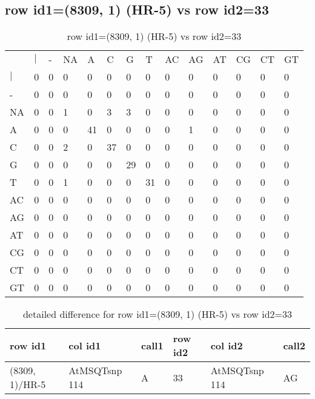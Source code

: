 \subsection{row id1=(8309, 1) (HR-5) vs row id2=33}
\begin{center}
\begin{longtable}{|l|l|l|l|l|l|l|l|l|l|l|l|l|l|}
\caption{row id1=(8309, 1) (HR-5) vs row id2=33} \label{table_dm292}\\
\hline
\\
\hline
&$|$&-&NA&A&C&G&T&AC&AG&AT&CG&CT&GT\\
$|$&0&0&0&0&0&0&0&0&0&0&0&0&0\\
-&0&0&0&0&0&0&0&0&0&0&0&0&0\\
NA&0&0&1&0&3&3&0&0&0&0&0&0&0\\
A&0&0&0&41&0&0&0&0&1&0&0&0&0\\
C&0&0&2&0&37&0&0&0&0&0&0&0&0\\
G&0&0&0&0&0&29&0&0&0&0&0&0&0\\
T&0&0&1&0&0&0&31&0&0&0&0&0&0\\
AC&0&0&0&0&0&0&0&0&0&0&0&0&0\\
AG&0&0&0&0&0&0&0&0&0&0&0&0&0\\
AT&0&0&0&0&0&0&0&0&0&0&0&0&0\\
CG&0&0&0&0&0&0&0&0&0&0&0&0&0\\
CT&0&0&0&0&0&0&0&0&0&0&0&0&0\\
GT&0&0&0&0&0&0&0&0&0&0&0&0&0\\
\hline
\end{longtable}
\end{center}

\begin{center}
\begin{longtable}{|l|l|l|l|l|l|}
\caption{detailed difference for row id1=(8309, 1) (HR-5) vs row id2=33} \label{table_dm293}\\
\hline
row id1&col id1&call1&row id2&col id2&call2\\
\hline
(8309, 1)/HR-5&AtMSQTsnp 114&A&33&AtMSQTsnp 114&AG\\
\hline
\end{longtable}
\end{center}

